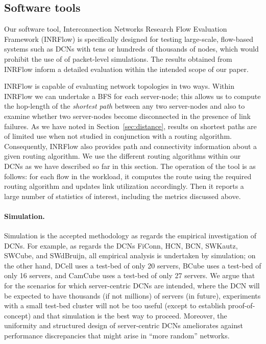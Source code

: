 \documentclass[]{amsart}
\begin{document}
{\subsection{Software tools}
\label{sec:setuptools}

Our software tool, Interconnection Networks Research Flow Evaluation Framework (INRFlow) \cite{TEF} is specifically designed for testing large-scale, flow-based systems such as DCNs with tens or hundreds of thousands of nodes, which would prohibit the use of of packet-level simulations.  The results obtained from INRFlow inform a detailed evaluation within the intended scope of our paper.

INRFlow is capable of evaluating network topologies in two
ways. Within INRFlow we can undertake a BFS for each server-node; this allows us to compute the hop-length of the \emph{shortest path} between any two server-nodes and also to examine whether two
server-nodes become disconnected in the presence of link failures.  As we have noted in Section~\ref{sec:distance}, results on shortest paths are of limited use when not studied in conjunction with a routing algorithm. Consequently, INRFlow also provides path and connectivity information about a given routing algorithm. We use the different routing algorithms within our DCNs as we have described so far in this section. The operation of the tool is
as follows: for each flow in the workload, it computes the route using the required routing algorithm and updates link utilization
accordingly.  Then it reports a large number of statistics of
interest, including the metrics discussed above. 

\paragraph{Simulation.} Simulation is the accepted methodology as regards the empirical investigation of DCNs. For example, as regards the DCNs FiConn, HCN, BCN, SWKautz, SWCube, and SWdBruijn, all empirical analysis is undertaken by simulation; on the other hand, DCell uses a test-bed of only 20 servers, BCube uses a test-bed of only 16 servers, and CamCube \cite{Abu-LibdehCostaRowstron2010} uses a test-bed of only 27 servers. We argue that for the scenarios for which server-centric DCNs are intended, where the DCN will be expected to have thousands (if not millions) of servers (in future), experiments with a small test-bed cluster will not be
too useful (except to establish proof-of-concept) and that simulation is the best way to proceed. Moreover, the uniformity and structured design of server-centric DCNs ameliorates against performance discrepancies that might arise in ``more random'' networks.

}
\end{document}
